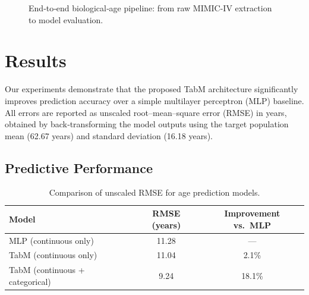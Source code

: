 \documentclass[manuscript,screen,review]{acmart}
\begin{document}
\begin{figure}[ht]
  \centering
  \caption{End‐to‐end biological‐age pipeline: from raw MIMIC-IV extraction to model evaluation.}
  \label{fig:pipeline}
\end{figure}


\section{Results}
\label{sec:results}

Our experiments demonstrate that the proposed TabM architecture significantly improves prediction accuracy over a simple multilayer perceptron (MLP) baseline.  All errors are reported as unscaled root–mean–square error (RMSE) in years, obtained by back‐transforming the model outputs using the target population mean (62.67 years) and standard deviation (16.18 years).

\subsection{Predictive Performance}
\begin{table}[ht]
  \centering
  \begin{tabular}{lcc}
    \toprule
    Model                                   & RMSE (years) & Improvement vs.\ MLP \\
    \midrule
    MLP (continuous only)                   & 11.28        & ---                  \\
    TabM (continuous only)                  & 11.04        & 2.1\%               \\
    TabM (continuous + categorical)         &  9.24        & 18.1\%              \\
    \bottomrule
  \end{tabular}
  \caption{Comparison of unscaled RMSE for age prediction models.}
  \label{tab:rmse_comparison}
\end{table}
\end{document}
